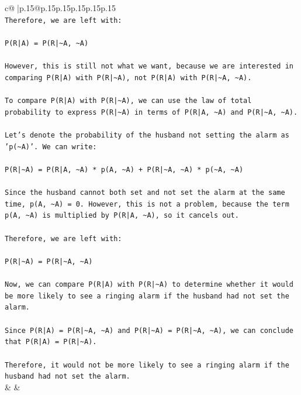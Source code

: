 \documentclass{article}
\begin{document}
{\begin{supertabular}{c@{$\;$}|p{.15\linewidth}@{}p{.15\linewidth}p{.15\linewidth}p{.15\linewidth}p{.15\linewidth}p{.15\linewidth}}
{{{\\ 
\texttt{Therefore, we are left with:} \\
\\ 
\texttt{P(R|A) = P(R|\textasciitilde{}A, \textasciitilde{}A)} \\
\\ 
\texttt{However, this is still not what we want, because we are interested in comparing P(R|A) with P(R|\textasciitilde{}A), not P(R|A) with P(R|\textasciitilde{}A, \textasciitilde{}A).} \\
\\ 
\texttt{To compare P(R|A) with P(R|\textasciitilde{}A), we can use the law of total probability to express P(R|\textasciitilde{}A) in terms of P(R|A, \textasciitilde{}A) and P(R|\textasciitilde{}A, \textasciitilde{}A).} \\
\\ 
\texttt{Let's denote the probability of the husband not setting the alarm as 'p(\textasciitilde{}A)'. We can write:} \\
\\ 
\texttt{P(R|\textasciitilde{}A) = P(R|A, \textasciitilde{}A) * p(A, \textasciitilde{}A) + P(R|\textasciitilde{}A, \textasciitilde{}A) * p(\textasciitilde{}A, \textasciitilde{}A)} \\
\\ 
\texttt{Since the husband cannot both set and not set the alarm at the same time, p(A, \textasciitilde{}A) = 0. However, this is not a problem, because the term p(A, \textasciitilde{}A) is multiplied by P(R|A, \textasciitilde{}A), so it cancels out.} \\
\\ 
\texttt{Therefore, we are left with:} \\
\\ 
\texttt{P(R|\textasciitilde{}A) = P(R|\textasciitilde{}A, \textasciitilde{}A)} \\
\\ 
\texttt{Now, we can compare P(R|A) with P(R|\textasciitilde{}A) to determine whether it would be more likely to see a ringing alarm if the husband had not set the alarm.} \\
\\ 
\texttt{Since P(R|A) = P(R|\textasciitilde{}A, \textasciitilde{}A) and P(R|\textasciitilde{}A) = P(R|\textasciitilde{}A, \textasciitilde{}A), we can conclude that P(R|A) = P(R|\textasciitilde{}A).} \\
\\ 
\texttt{Therefore, it would not be more likely to see a ringing alarm if the husband had not set the alarm.} \\
            }
        }
    }
    & & \\ \\


\end{supertabular}}
\end{document}
